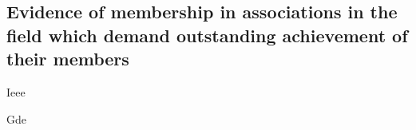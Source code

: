 \subsection{%
    Evidence of \mrls membership in associations in the field
    which demand outstanding achievement of their members%
}
\label{subsec:Associations}

{Ieee}

\pagebreak

{Gde}

\pagebreak
